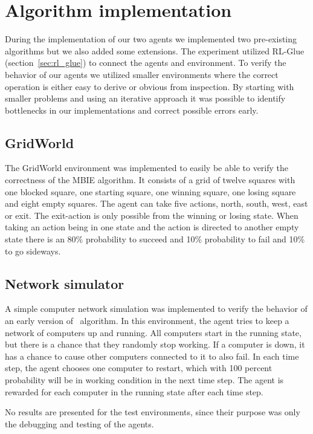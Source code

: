 \section{Algorithm implementation}
\label{sec:implementation}

During the implementation of our two agents we implemented two pre-existing 
algorithms but we also added some extensions. The experiment utilized RL-Glue
(section~\ref{sec:rl_glue}) to connect the agents and environment.  To verify
the behavior of our agents we utilized smaller environments where the correct
operation is either easy to derive or obvious from inspection. By starting with
smaller problems and using an iterative approach it was possible to identify
bottlenecks in our implementations and correct possible errors early.





\subsection{GridWorld}
\label{sec:intro_grid_world}

The GridWorld environment was implemented to easily be able to verify the
correctness of the MBIE algorithm. It consists of a grid of twelve squares with
one blocked square, one starting square, one winning square, one losing square and
eight empty squares. The agent can take five actions, north, south, west,
east or exit. The exit-action is only possible from the winning or losing
state. When taking an action being in one state and the action is directed to
another empty state there is an 80\% probability to succeed and 10\%
probability to fail and 10\% to go sideways.

\subsection{Network simulator}

A simple computer network simulation was implemented to verify the behavior of an
early version of \etre\ algorithm. In this environment, the agent tries to keep
a network of computers up and running. All computers start in the running
state, but there is a chance that they randomly stop working. If a computer is
down, it has a chance to cause other computers connected to it to also fail. In
each time step, the agent chooses one computer to restart, which with 100
percent probability will be in working condition in the next time step. The
agent is rewarded for each computer in the running state after each time step. 

No results are presented for the test environments, since their purpose was only the 
debugging and testing of the agents. 
